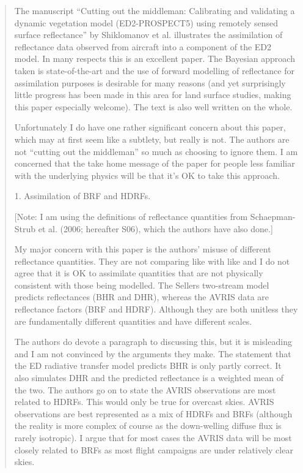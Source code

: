 \begin{quote}
  The manuscript “Cutting out the middleman: Calibrating and validating a dynamic vegetation model (ED2-PROSPECT5) using remotely sensed surface reflectance” by Shiklomanov et al. illustrates the assimilation of reflectance data observed from aircraft into a component of the ED2 model. In many respects this is an excellent paper. The Bayesian approach taken is state-of-the-art and the use of forward modelling of reflectance for assimilation purposes is desirable for many reasons (and yet surprisingly little progress has been made in this area for land surface studies, making this paper especially welcome). The text is also well written on the whole.

  Unfortunately I do have one rather significant concern about this paper, which may at first seem like a subtlety, but really is not. The authors are not “cutting out the middleman” so much as choosing to ignore them. I am concerned that the take home message of the paper for people less familiar with the underlying physics will be that it’s OK to take this approach.

  1. Assimilation of BRF and HDRFs.

  [Note: I am using the definitions of reflectance quantities from Schaepman-Strub et al.
  (2006; hereafter S06), which the authors have also done.]

  My major concern with this paper is the authors’ misuse of different reflectance quantities. They are not comparing like with like and I do not agree that it is OK to assimilate quantities that are not physically consistent with those being modelled. The Sellers two-stream model predicts reflectances (BHR and DHR), whereas the AVRIS data are reflectance factors (BRF and HDRF). Although they are both unitless they are fundamentally different quantities and have different scales.

  The authors do devote a paragraph to discussing this, but it is misleading and I am not convinced by the arguments they make. The statement that the ED radiative transfer model predicts BHR is only partly correct. It also simulates DHR and the predicted reflectance is a weighted mean of the two. The authors go on to state the AVRIS observations are most related to HDRFs. This would only be true for overcast skies. AVRIS observations are best represented as a mix of HDRFs and BRFs (although the reality is more complex of course as the down-welling diffuse flux is rarely isotropic). I argue that for most cases the AVRIS data will be most closely related to BRFs as most flight campaigns are under relatively clear skies.


\end{quote}
